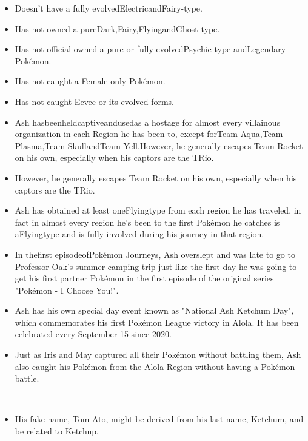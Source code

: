 \documentclass[a4paper,12pt]{article}
\begin{document}
\begin{itemize}
\item Doesn't have a fully evolvedElectricandFairy-type.
\item Has not owned a pureDark,Fairy,FlyingandGhost-type.
\item Has not official owned a pure or fully evolvedPsychic-type andLegendary Pokémon.
\item Has not caught a Female-only Pokémon.
\item Has not caught Eevee or its evolved forms.
\item Ash hasbeenheldcaptiveandusedas a hostage for almost every villainous organization in each Region he has been to, except forTeam Aqua,Team Plasma,Team SkullandTeam Yell.However, he generally escapes Team Rocket on his own, especially when his captors are the TRio.
\item However, he generally escapes Team Rocket on his own, especially when his captors are the TRio.
\item Ash has obtained at least oneFlyingtype from each region he has traveled, in fact in almost every region he's been to the first Pokémon he catches is aFlyingtype and is fully involved during his journey in that region.
\item In thefirst episodeofPokémon Journeys, Ash overslept and was late to go to Professor Oak's summer camping trip just like the first day he was going to get his first partner Pokémon in the first episode of the original series "Pokémon - I Choose You!".
\item Ash has his own special day event known as "National Ash Ketchum Day", which commemorates his first Pokémon League victory in Alola. It has been celebrated every September 15 since 2020.
\item Just as Iris and May captured all their Pokémon without battling them, Ash also caught his Pokémon from the Alola Region without having a Pokémon battle.
\end{itemize}\\ \par \vspace{0.5cm}

\begin{itemize}
\item His fake name, Tom Ato, might be derived from his last name, Ketchum, and be related to Ketchup.
\end{itemize}\\ \par \vspace{0.5cm}
\end{document}
